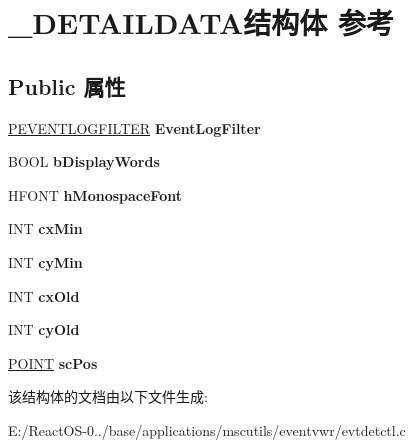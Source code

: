 \hypertarget{struct___d_e_t_a_i_l_d_a_t_a}{}\section{\+\_\+\+D\+E\+T\+A\+I\+L\+D\+A\+T\+A结构体 参考}
\label{struct___d_e_t_a_i_l_d_a_t_a}
\subsection*{Public 属性}
\begin{DoxyCompactItemize}
\item 
\mbox{\label{struct___d_e_t_a_i_l_d_a_t_a_a1563d941cdc7880a62844eaf75e42dff}} 
\hyperlink{struct___e_v_e_n_t_l_o_g_f_i_l_t_e_r}{P\+E\+V\+E\+N\+T\+L\+O\+G\+F\+I\+L\+T\+ER} {\bfseries Event\+Log\+Filter}
\item 
\mbox{\label{struct___d_e_t_a_i_l_d_a_t_a_aaa17b55b166fce3554ae817ad2344060}} 
B\+O\+OL {\bfseries b\+Display\+Words}
\item 
\mbox{\label{struct___d_e_t_a_i_l_d_a_t_a_af78c3e26943c88900ad76de15c7f3f7b}} 
H\+F\+O\+NT {\bfseries h\+Monospace\+Font}
\item 
\mbox{\label{struct___d_e_t_a_i_l_d_a_t_a_a128dc73d7bf5dc04080d054906571399}} 
I\+NT {\bfseries cx\+Min}
\item 
\mbox{\label{struct___d_e_t_a_i_l_d_a_t_a_acdca6a508a0bce11a6991a26e59fa4e0}} 
I\+NT {\bfseries cy\+Min}
\item 
\mbox{\label{struct___d_e_t_a_i_l_d_a_t_a_a2fc9cefac2eaf80cee3306382c37b794}} 
I\+NT {\bfseries cx\+Old}
\item 
\mbox{\label{struct___d_e_t_a_i_l_d_a_t_a_a930ab7ff82589860492eec1cc171adf0}} 
I\+NT {\bfseries cy\+Old}
\item 
\mbox{\label{struct___d_e_t_a_i_l_d_a_t_a_a946a82196110c762ee0d00832f9c8c22}} 
\hyperlink{structtag_p_o_i_n_t}{P\+O\+I\+NT} {\bfseries sc\+Pos}
\end{DoxyCompactItemize}


该结构体的文档由以下文件生成\+:\begin{DoxyCompactItemize}
\item 
E\+:/\+React\+O\+S-\/0../base/applications/mscutils/eventvwr/evtdetctl.\+c\end{DoxyCompactItemize}
